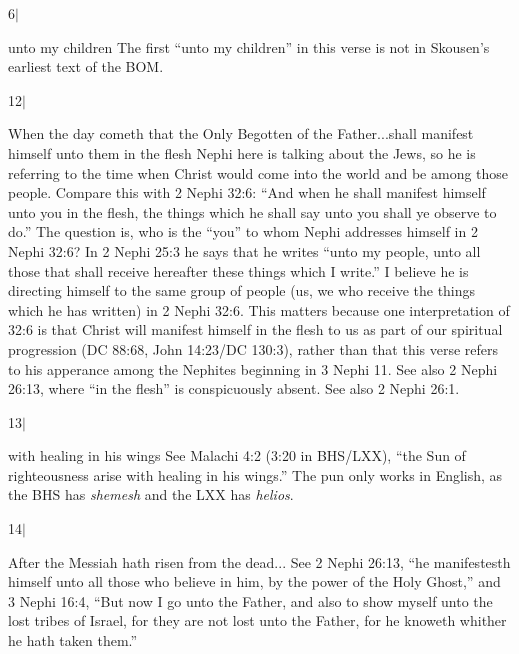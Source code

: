 		\begin{compactdesc}

		\item[6$\vert$]
		\begin{compactdesc}
		\item[unto my children] The first ``unto my children'' in this verse is not in Skousen's earliest text of the BOM.
		\end{compactdesc}

		\item[12$\vert$]
		\begin{compactdesc}
		\item[When the day cometh that the Only Begotten of the Father...shall manifest himself unto them in the flesh] Nephi here is talking about the Jews, so he is referring to the time when Christ would come into the world and be among those people. Compare this with 2 Nephi 32:6: ``And when he shall manifest himself unto you in the flesh, the things which he shall say unto you shall ye observe to do.'' The question is, who is the ``you'' to whom Nephi addresses himself in 2 Nephi 32:6? In 2 Nephi 25:3 he says that he writes ``unto my people, unto all those that shall receive hereafter these things which I write.'' I believe he is directing himself to the same group of people (us, we who receive the things which he has written) in 2 Nephi 32:6. This matters because one interpretation of 32:6 is that Christ will manifest himself in the flesh to us as part of our spiritual progression (DC 88:68, John 14:23/DC 130:3), rather than that this verse refers to his apperance among the Nephites beginning in 3 Nephi 11. See also 2 Nephi 26:13, where ``in the flesh'' is conspicuously absent. See also 2 Nephi 26:1.
		\end{compactdesc}

		\item[13$\vert$]
		\begin{compactdesc}
		\item[with healing in his wings] See Malachi 4:2 (3:20 in BHS/LXX), ``the Sun of righteousness arise with healing in his wings.'' The pun only works in English, as the BHS has \textit{shemesh} and the LXX has \textit{helios}.
		\end{compactdesc}

		\item[14$\vert$]
		\begin{compactdesc}
		\item[After the Messiah hath risen from the dead...] See 2 Nephi 26:13, ``he manifestesth himself unto all those who believe in him, by the power of the Holy Ghost,'' and 3 Nephi 16:4, ``But now I go unto the Father, and also to show myself unto the lost tribes of Israel, for they are not lost unto the Father, for he knoweth whither he hath taken them.''
		\end{compactdesc}


\end{compactdesc}

